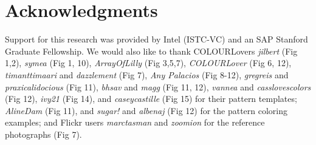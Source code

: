 \section*{Acknowledgments}

Support for this research was provided by Intel (ISTC-VC) and an SAP Stanford Graduate Fellowship.
We would also like to thank COLOURLovers \textit{jilbert} (Fig 1,2), \textit{symea} (Fig 1, 10), \textit{ArrayOfLilly} (Fig 3,5,7), \textit{COLOURLover} (Fig 6, 12), \textit{timanttimaari} and \textit{dazzlement} (Fig 7), \textit{Any Palacios} (Fig 8-12), \textit{gregreis} and \textit{praxicalidocious} (Fig 11), \textit{bhsav} and \textit{magg} (Fig 11, 12), \textit{vannea} and \textit{casslovescolors} (Fig 12), \textit{ivy21} (Fig 14), and \textit{caseycastille} (Fig 15) for their pattern templates; \textit{AlineDam} (Fig 11), and \textit{sugar!} and \textit{albenaj} (Fig 12) for the pattern coloring examples; and Flickr users \textit{marctasman} and \textit{zoomion} for the reference photographs (Fig 7).   

